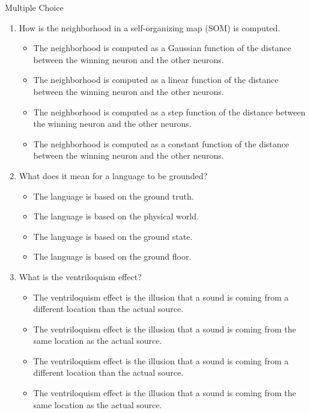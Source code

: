 \documentclass{article}
\begin{document}

\begin{exercise}{Multiple Choice}
  \begin{enumerate}
    \item How is the neighborhood in a self-organizing map (SOM) is computed.

      \begin{itemize}
        \item The neighborhood is computed as a Gaussian function of the distance between the winning neuron and the other neurons.
        \item The neighborhood is computed as a linear function of the distance between the winning neuron and the other neurons.
        \item The neighborhood is computed as a step function of the distance between the winning neuron and the other neurons.
        \item The neighborhood is computed as a constant function of the distance between the winning neuron and the other neurons.
      \end{itemize}

    \item What does it mean for a language to be grounded?

      \begin{itemize}
        \item The language is based on the ground truth.
        \item The language is based on the physical world.
        \item The language is based on the ground state.
        \item The language is based on the ground floor.
      \end{itemize}

    \item What is the ventriloquism effect?

      \begin{itemize}
        \item The ventriloquism effect is the illusion that a sound is coming from a different location than the actual source.
        \item The ventriloquism effect is the illusion that a sound is coming from the same location as the actual source.
        \item The ventriloquism effect is the illusion that a sound is coming from a different location than the actual source.
        \item The ventriloquism effect is the illusion that a sound is coming from the same location as the actual source.
      \end{itemize}
  \end{enumerate}


\end{exercise}
\end{document}

